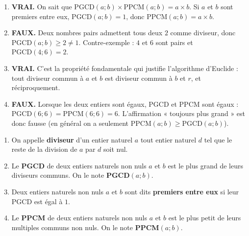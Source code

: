 \documentclass[11pt]{article}
\newcommand{\cle}[1]{{\popxbold\color{popdark}#1}}
\begin{document}
\begin{corrige}
\begin{enumerate}
    \item \textbf{VRAI.} On sait que $\text{PGCD}(a ; b) \times \text{PPCM}(a ; b) = a \times b$. Si $a$ et $b$ sont premiers entre eux, $\text{PGCD}(a ; b) = 1$, donc $\text{PPCM}(a ; b) = a \times b$.
    \item \textbf{FAUX.} Deux nombres pairs admettent tous deux $2$ comme diviseur, donc $\text{PGCD}(a ; b) \geq 2 \neq 1$. Contre-exemple : $4$ et $6$ sont pairs et $\text{PGCD}(4 ; 6) = 2$.
    \item \textbf{VRAI.} C'est la propriété fondamentale qui justifie l'\cle{algorithme d'Euclide} : tout diviseur commun à $a$ et $b$ est diviseur commun à $b$ et $r$, et réciproquement.
    \item \textbf{FAUX.} Lorsque les deux entiers sont égaux, PGCD et PPCM sont égaux : $\text{PGCD}(6 ; 6) = \text{PPCM}(6 ; 6) = 6$. L'affirmation « toujours plus grand » est donc fausse (en général on a seulement $\text{PPCM}(a;b) \geq \text{PGCD}(a;b)$).
\end{enumerate}
\end{corrige}

\begin{corrige}
\begin{enumerate}
    \item On appelle \textbf{diviseur} d'un entier naturel $a$ tout entier naturel $d$ tel que le reste de la division de $a$ par $d$ soit nul.
    \item Le \textbf{PGCD} de deux entiers naturels non nuls $a$ et $b$ est le plus grand de leurs diviseurs communs. On le note \textbf{PGCD$(a ; b)$}.
    \item Deux entiers naturels non nuls $a$ et $b$ sont dits \textbf{premiers entre eux} si leur PGCD est égal à $1$.
    \item Le \textbf{PPCM} de deux entiers naturels non nuls $a$ et $b$ est le plus petit de leurs multiples communs non nuls. On le note \textbf{PPCM$(a ; b)$}.
\end{enumerate}
\end{corrige}
\end{document}
